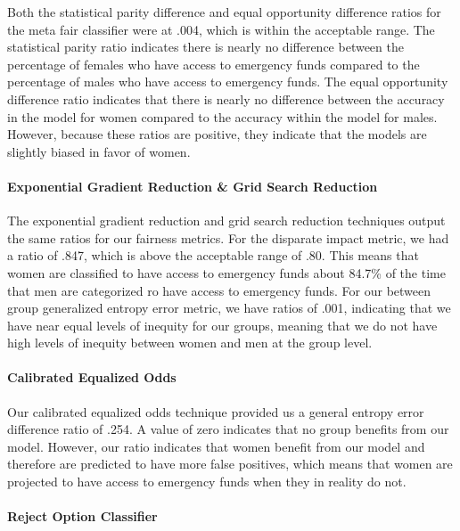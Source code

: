 \documentclass[water,article,submit,moreauthors,pdftex]{mdpi}
\begin{document}
Both the statistical parity difference and equal opportunity difference
ratios for the meta fair classifier were at .004, which is within the
acceptable range. The statistical parity ratio indicates there is nearly
no difference between the percentage of females who have access to
emergency funds compared to the percentage of males who have access to
emergency funds. The equal opportunity difference ratio indicates that
there is nearly no difference between the accuracy in the model for
women compared to the accuracy within the model for males. However,
because these ratios are positive, they indicate that the models are
slightly biased in favor of women.

\hypertarget{exponential-gradient-reduction-grid-search-reduction}{%
\paragraph{Exponential Gradient Reduction \& Grid Search
Reduction}\label{exponential-gradient-reduction-grid-search-reduction}}

The exponential gradient reduction and grid search reduction techniques
output the same ratios for our fairness metrics. For the disparate
impact metric, we had a ratio of .847, which is above the acceptable
range of .80. This means that women are classified to have access to
emergency funds about 84.7\% of the time that men are categorized ro
have access to emergency funds. For our between group generalized
entropy error metric, we have ratios of .001, indicating that we have
near equal levels of inequity for our groups, meaning that we do not
have high levels of inequity between women and men at the group level.

\hypertarget{calibrated-equalized-odds}{%
\paragraph{Calibrated Equalized Odds}\label{calibrated-equalized-odds}}

Our calibrated equalized odds technique provided us a general entropy
error difference ratio of .254. A value of zero indicates that no group
benefits from our model. However, our ratio indicates that women benefit
from our model and therefore are predicted to have more false positives,
which means that women are projected to have access to emergency funds
when they in reality do not.

\hypertarget{reject-option-classifier}{%
\paragraph{Reject Option Classifier}\label{reject-option-classifier}}
\end{document}
